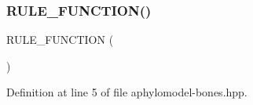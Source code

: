 \subsubsection{\texorpdfstring{R\+U\+L\+E\+\_\+\+F\+U\+N\+C\+T\+I\+O\+N()}{RULE\_FUNCTION()}}
{\footnotesize\ttfamily R\+U\+L\+E\+\_\+\+F\+U\+N\+C\+T\+I\+ON (\begin{DoxyParamCaption}\item[{rule\+\_\+empty\+\_\+free}]{ }\end{DoxyParamCaption})}



Definition at line 5 of file aphylomodel-\/bones.\+hpp.

